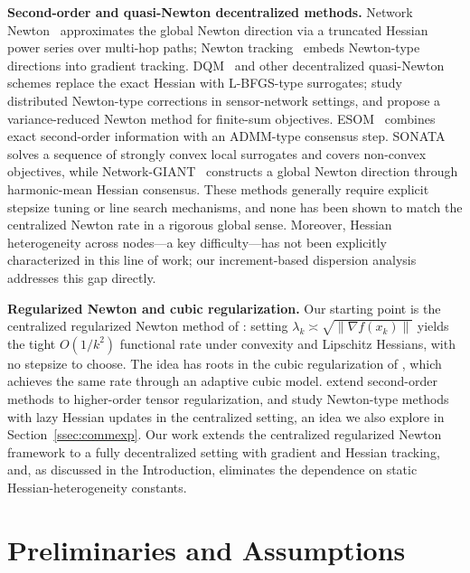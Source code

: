 \documentclass[11pt,a4paper]{article}
\def\cO{O}%
\newcommand{\cO}{\mathcal{O}}
\begin{document}
	\noindent\textbf{Second-order and quasi-Newton decentralized methods.}
	Network Newton~\citep{mokhtari2015networknewton_arxiv} approximates
	the global Newton direction via a truncated Hessian power series
	over multi-hop paths; Newton
	tracking~\citep{mokhtari2020newtontracking} embeds Newton-type
	directions into gradient tracking.
	DQM~\citep{eisen2017dqn} and other decentralized quasi-Newton
	schemes replace the exact Hessian with L-BFGS-type surrogates;
	\citet{bajovic2017newton} study distributed Newton-type corrections
	in sensor-network settings, and \citet{zhang2021distributed} propose
	a variance-reduced Newton method for finite-sum objectives.
	ESOM~\citep{mokhtari2016esom} combines exact second-order
	information with an ADMM-type consensus step.
	SONATA~\citep{sun2022sonata} solves a sequence of strongly
	convex local surrogates and covers non-convex objectives, while
	Network-GIANT~\citep{ye2023networkgiant} constructs a
	global Newton direction through harmonic-mean Hessian consensus.
	These methods generally require explicit stepsize tuning or
	line search mechanisms, and none has been shown to match the
	centralized Newton rate in a rigorous global sense.
	Moreover, Hessian heterogeneity across nodes---a key
	difficulty---has not been explicitly characterized in this
	line of work; our increment-based dispersion analysis
	addresses this gap directly.
	
	\noindent\textbf{Regularized Newton and cubic regularization.}
	Our starting point is the centralized regularized Newton method
	of \citet{mishchenko2023rn}:
	setting $\lambda_k\asymp\sqrt{\|\nabla f(x_k)\|}$ yields the
	tight $\cO(1/k^2)$ functional rate under convexity and
	Lipschitz Hessians, with no stepsize to choose.
	The idea has roots in the cubic regularization of
	\citet{nesterov2006cubic,cartis2011arc}, which achieves the
	same rate through an adaptive cubic model.
	\citet{doikov2021optimization} extend second-order methods to
	higher-order tensor regularization, and
	\citet{hanzely2022newton} study Newton-type methods with lazy
	Hessian updates in the centralized setting, an idea we also
	explore in Section~\ref{ssec:commexp}.
	Our work extends the centralized regularized Newton
	framework to a fully decentralized setting with gradient and
	Hessian tracking, and, as discussed in the Introduction,
	eliminates the dependence on static Hessian-heterogeneity constants.
	
	\section{Preliminaries and Assumptions}\label{sec:prelim}
\end{document}
